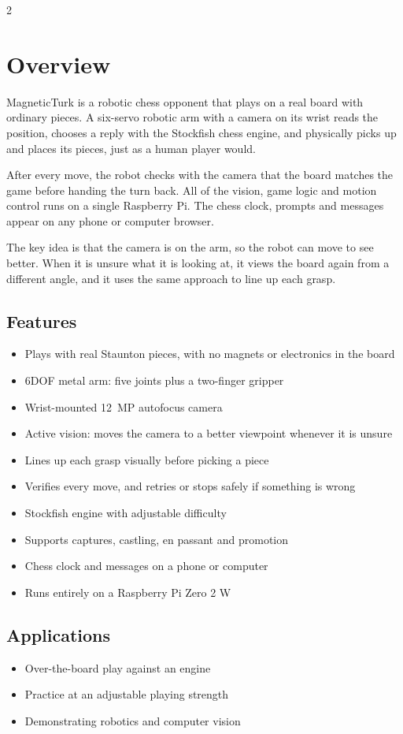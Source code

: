 \documentclass[10pt,a4paper]{article}
\newcommand{\product}{MagneticTurk}
\begin{document}
\begin{multicols}{2}
\section{Overview}
\product{} is a robotic chess opponent that plays on a real board with ordinary pieces.
A six-servo robotic arm with a camera on its wrist reads the position, chooses a reply
with the Stockfish chess engine, and physically picks up and places its pieces, just
as a human player would.

After every move, the robot checks with the camera that the board matches the game
before handing the turn back. All of the vision, game logic and motion control runs on a
single Raspberry Pi. The chess clock, prompts and messages appear on any phone or
computer browser.

The key idea is that the camera is on the arm, so the robot can move to see better.
When it is unsure what it is looking at, it views the board again from a different angle,
and it uses the same approach to line up each grasp.

\subsection{Features}
\begin{itemize}
  \item Plays with real Staunton pieces, with no magnets or electronics in the board
  \item 6DOF metal arm: five joints plus a two-finger gripper
  \item Wrist-mounted \SI{12}{MP} autofocus camera
  \item Active vision: moves the camera to a better viewpoint whenever it is unsure
  \item Lines up each grasp visually before picking a piece
  \item Verifies every move, and retries or stops safely if something is wrong
  \item Stockfish engine with adjustable difficulty
  \item Supports captures, castling, en passant and promotion
  \item Chess clock and messages on a phone or computer
  \item Runs entirely on a Raspberry Pi Zero 2 W
\end{itemize}

\subsection{Applications}
\begin{itemize}
  \item Over-the-board play against an engine
  \item Practice at an adjustable playing strength
  \item Demonstrating robotics and computer vision
\end{itemize}


\end{multicols}
\end{document}
